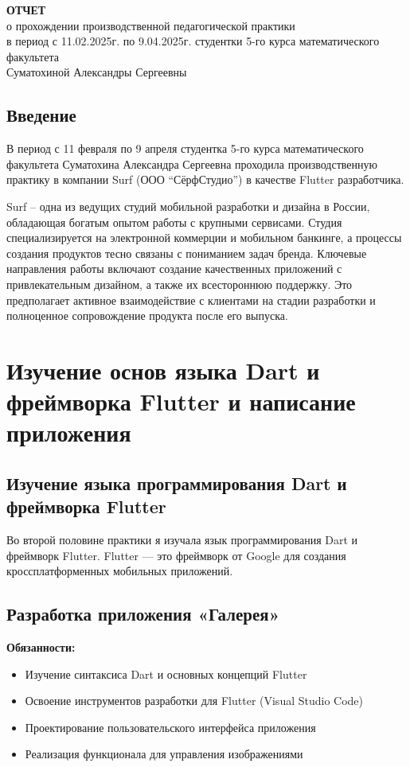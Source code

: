 \documentclass[a4paper, 12pt]{extarticle}
\begin{document}
\begin{center}
    \textbf{ОТЧЕТ}\\
    о прохождении производственной педагогической практики\\
    в период с 11.02.2025г. по 9.04.2025г.
    студентки 5-го курса математического факультета\\
    Суматохиной Александры Сергеевны
    \end{center}

\subsection*{Введение}

В период с 11 февраля по 9 апреля студентка 5-го курса математического факультета Суматохина Александра Сергеевна проходила производственную практику в компании Surf (ООО “СёрфСтудио”) в качестве Flutter разработчика.

Surf – одна из ведущих студий мобильной разработки и дизайна в России, обладающая богатым опытом работы с крупными сервисами. Студия специализируется на электронной коммерции и мобильном банкинге, а процессы создания продуктов тесно связаны с пониманием задач бренда. Ключевые направления работы включают создание качественных приложений с привлекательным дизайном, а также их всестороннюю поддержку. Это предполагает активное взаимодействие с клиентами на стадии разработки и полноценное сопровождение продукта после его выпуска.

\section{Изучение основ языка Dart и фреймворка Flutter и написание приложения}
\subsection{Изучение языка программирования Dart и фреймворка Flutter}
Во второй половине практики я изучала язык программирования Dart и фреймворк Flutter. Flutter — это фреймворк от Google для создания кроссплатформенных мобильных приложений.

\subsection{Разработка приложения «Галерея»}
\textbf{Обязанности:}
\begin{itemize}
    \item Изучение синтаксиса Dart и основных концепций Flutter
    \item Освоение инструментов разработки для Flutter (Visual Studio Code)
    \item Проектирование пользовательского интерфейса приложения
    \item Реализация функционала для управления изображениями
\end{itemize}
\end{document}
